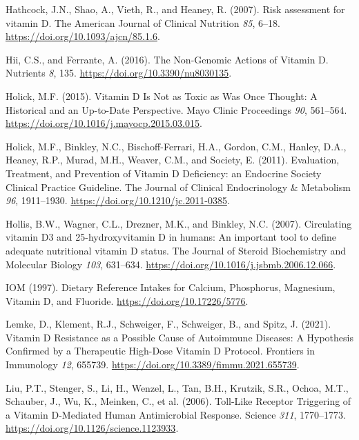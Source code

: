 \documentclass[
  letterpaper,
  DIV=11,
  numbers=noendperiod]{scrartcl}
\newlength{\cslhangindent}
\newlength{\cslentryspacingunit} %
\newenvironment{CSLReferences}[2] %
 {%
  \setlength{\parindent}{0pt}
  \ifodd #1
  \let\oldpar\par
  \def\par{\hangindent=\cslhangindent\oldpar}
  \fi
  \setlength{\parskip}{#2\cslentryspacingunit}
 }%
 {}
\begin{document}
\begin{CSLReferences}{0}{0}
\leavevmode{}%
Hathcock, J.N., Shao, A., Vieth, R., and Heaney, R. (2007). {Risk
assessment for vitamin D}. The American Journal of Clinical Nutrition
\emph{85}, 6--18. \url{https://doi.org/10.1093/ajcn/85.1.6}.

\leavevmode{}%
Hii, C.S., and Ferrante, A. (2016). {The Non-Genomic Actions of Vitamin
D}. Nutrients \emph{8}, 135. \url{https://doi.org/10.3390/nu8030135}.

\leavevmode{}%
Holick, M.F. (2015). {Vitamin D Is Not as Toxic as Was Once Thought: A
Historical and an Up-to-Date Perspective}. Mayo Clinic Proceedings
\emph{90}, 561--564. \url{https://doi.org/10.1016/j.mayocp.2015.03.015}.

\leavevmode{}%
Holick, M.F., Binkley, N.C., Bischoff-Ferrari, H.A., Gordon, C.M.,
Hanley, D.A., Heaney, R.P., Murad, M.H., Weaver, C.M., and Society, E.
(2011). {Evaluation, Treatment, and Prevention of Vitamin D Deficiency:
an Endocrine Society Clinical Practice Guideline}. The Journal of
Clinical Endocrinology \& Metabolism \emph{96}, 1911--1930.
\url{https://doi.org/10.1210/jc.2011-0385}.

\leavevmode{}%
Hollis, B.W., Wagner, C.L., Drezner, M.K., and Binkley, N.C. (2007).
{Circulating vitamin D3 and 25-hydroxyvitamin D in humans: An important
tool to define adequate nutritional vitamin D status}. The Journal of
Steroid Biochemistry and Molecular Biology \emph{103}, 631--634.
\url{https://doi.org/10.1016/j.jsbmb.2006.12.066}.

\leavevmode{}%
IOM (1997). {Dietary Reference Intakes for Calcium, Phosphorus,
Magnesium, Vitamin D, and Fluoride}.
\url{https://doi.org/10.17226/5776}.

\leavevmode{}%
Lemke, D., Klement, R.J., Schweiger, F., Schweiger, B., and Spitz, J.
(2021). {Vitamin D Resistance as a Possible Cause of Autoimmune
Diseases: A Hypothesis Confirmed by a Therapeutic High-Dose Vitamin D
Protocol}. Frontiers in Immunology \emph{12}, 655739.
\url{https://doi.org/10.3389/fimmu.2021.655739}.

\leavevmode{}%
Liu, P.T., Stenger, S., Li, H., Wenzel, L., Tan, B.H., Krutzik, S.R.,
Ochoa, M.T., Schauber, J., Wu, K., Meinken, C., et al. (2006).
{Toll-Like Receptor Triggering of a Vitamin D-Mediated Human
Antimicrobial Response}. Science \emph{311}, 1770--1773.
\url{https://doi.org/10.1126/science.1123933}.


\end{CSLReferences}
\end{document}
